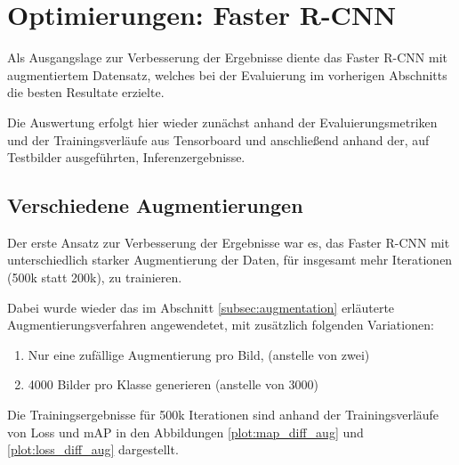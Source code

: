 \section{Optimierungen: Faster R-CNN}
\label{sec:optimierung_faster_rcnn}

Als Ausgangslage zur Verbesserung der Ergebnisse diente 
das Faster R-CNN mit augmentiertem Datensatz, welches
bei der Evaluierung im vorherigen Abschnitts die besten
Resultate erzielte.

Die Auswertung erfolgt hier wieder zunächst 
anhand der Evaluierungsmetriken und der Trainingsverläufe
aus Tensorboard und anschließend anhand der,
auf Testbilder ausgeführten, Inferenzergebnisse.



\subsection{Verschiedene Augmentierungen}

Der erste Ansatz zur Verbesserung der Ergebnisse war es,
das Faster R-CNN mit unterschiedlich starker Augmentierung
der Daten, für insgesamt mehr Iterationen
(500k statt 200k), zu trainieren.

Dabei wurde wieder das im Abschnitt \ref{subsec:augmentation} 
erläuterte Augmentierungsverfahren angewendetet, mit zusätzlich 
folgenden Variationen:

\begin{enumerate}
  \item Nur eine zufällige Augmentierung pro Bild, (anstelle von zwei)
  \item 4000 Bilder pro Klasse generieren (anstelle von 3000) 
\end{enumerate}

Die Trainingsergebnisse für 500k Iterationen sind anhand der 
Trainingsverläufe von Loss und mAP in den Abbildungen
\ref{plot:map_diff_aug} und \ref{plot:loss_diff_aug} dargestellt.

\vspace{1cm}
\begin{minipage}{0.5\textwidth}
  \centering
  \def\svgwidth{0.9\textwidth}
  
  \label{plot:map_diff_aug}
\end{minipage}
\begin{minipage}{0.5\textwidth}
  \centering
  \def\svgwidth{0.9\textwidth}
  
  \label{plot:loss_diff_aug}
\end{minipage}

